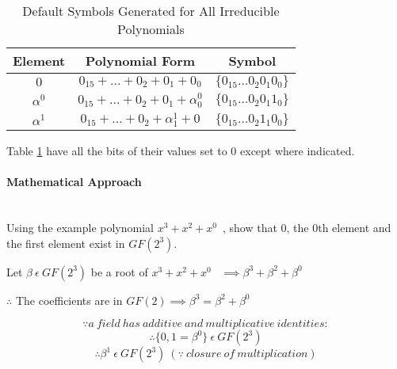 \documentclass[11pt]{extarticle}
\newcommand{\examplepoly}{$x^{3}+x^{2}+x^{0}$}
\begin{document}
            \begin{table}[h]
                \def\arraystretch{2.5}
                \caption{Default Symbols Generated for All Irreducible
                Polynomials}
                \centering
                \begin{tabular*}{300pt}{@{\extracolsep{\fill}} ccc}

                \textbf{Element} & \textbf{Polynomial Form} & \textbf{Symbol}
                \\
                \hline
                $0$ & $0_{15} + \ldots + 0_{2} + 0_{1} + 0_{0}$ &
                $\{ 0_{15} \ldots 0_{2} 0_{1} 0_{0} \}$ \\

                $\alpha^{0}$ & $0_{15} + \ldots + 0_{2} + 0_{1} +
                \alpha^{0}_{0}$ & $\{0_{15} \ldots 0_{2} 0_{1} 1_{0} \}$ \\

                $\alpha^{1}$ & $0_{15} + \ldots + 0_{2} + \alpha^{1}_{1} + 0$ &
                $\{ 0_{15} \ldots 0_{2} 1_{1} 0_{0} \}$ \\

                \end{tabular*}
                \label{table:default_sym}
            \end{table}

            Table \ref{table:default_sym} have all the bits of their values set
            to $0$ except where indicated.

                \paragraph{Mathematical Approach} \leavevmode\\ Using the example polynomial \examplepoly~, show that 0, the 0th element and the first element exist in $GF(2^{3})$.

                \hspace*{\fill}
                \centerline{Let $\beta \ \epsilon \ GF(2^{3})$ be a root of
                \examplepoly~ $\implies \beta^{3}+\beta^{2}+\beta^{0}$}

                \hspace*{\fill}
                \centerline{$\therefore$ The coefficients are in $GF(2) \implies
                \beta^{3}=\beta^{2}+\beta^{0}$}
                \[ \because a \ field \ has \ additive \ and \ multiplicative \
                identities: \]
                \[ \therefore \{ 0, 1=\beta^{0} \} \ \epsilon \ GF(2^{3}) \]
                \[ \therefore \beta^{1} \ \epsilon \ GF(2^{3}) \ (\because \
                closure \ of \ multiplication) \]
            \newpage
\end{document}
